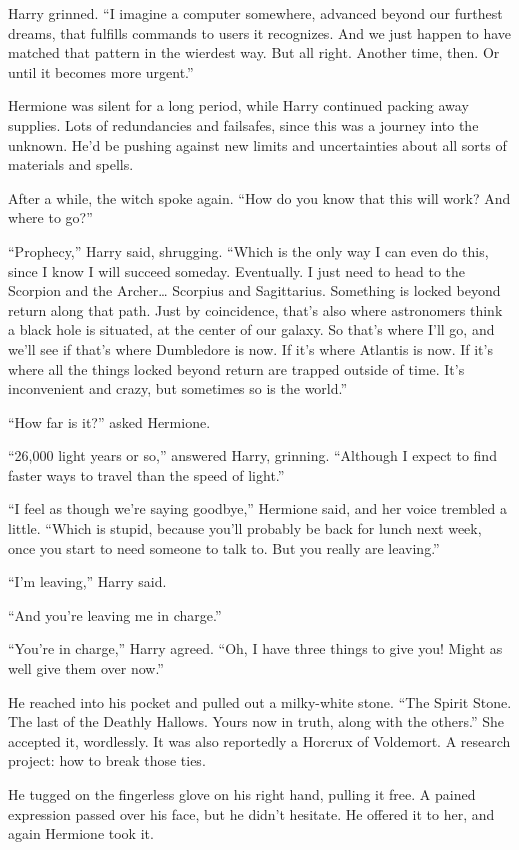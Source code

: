 Harry grinned. ``I imagine a computer somewhere, advanced beyond our
furthest dreams, that fulfills commands to users it recognizes. And we
just happen to have matched that pattern in the wierdest way. But all
right. Another time, then. Or until it becomes more urgent.''

Hermione was silent for a long period, while Harry continued packing
away supplies. Lots of redundancies and failsafes, since this was a
journey into the unknown. He'd be pushing against new limits and
uncertainties about all sorts of materials and spells.

After a while, the witch spoke again. ``How do you know that this will
work? And where to go?''

``Prophecy,'' Harry said, shrugging. ``Which is the only way I can even
do this, since I know I will succeed someday. Eventually. I just need to
head to the Scorpion and the Archer\ldots{} Scorpius and Sagittarius.
Something is locked beyond return along that path. Just by coincidence,
that's also where astronomers think a black hole is situated, at the
center of our galaxy. So that's where I'll go, and we'll see if that's
where Dumbledore is now. If it's where Atlantis is now. If it's where
all the things locked beyond return are trapped outside of time. It's
inconvenient and crazy, but sometimes so is the world.''

``How far is it?'' asked Hermione.

``26,000 light years or so,'' answered Harry, grinning. ``Although I
expect to find faster ways to travel than the speed of light.''

``I feel as though we're saying goodbye,'' Hermione said, and her voice
trembled a little. ``Which is stupid, because you'll probably be back
for lunch next week, once you start to need someone to talk to. But you
really are leaving.''

``I'm leaving,'' Harry said.

``And you're leaving me in charge.''

``You're in charge,'' Harry agreed. ``Oh, I have three things to give
you! Might as well give them over now.''

He reached into his pocket and pulled out a milky-white stone. ``The
Spirit Stone. The last of the Deathly Hallows. Yours now in truth, along
with the others.'' She accepted it, wordlessly. It was also reportedly a
Horcrux of Voldemort. A research project: how to break those ties.

He tugged on the fingerless glove on his right hand, pulling it free. A
pained expression passed over his face, but he didn't hesitate. He
offered it to her, and again Hermione took it.

